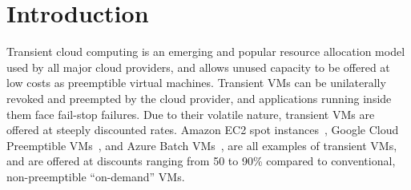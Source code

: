 \section{Introduction}
\label{sec:intro}








Transient cloud computing is an emerging and popular resource allocation model used by all major cloud providers, and allows unused capacity to be offered at low costs as preemptible virtual machines.
Transient VMs can be unilaterally revoked and preempted by the cloud provider, and applications running inside them face fail-stop failures. 
Due to their volatile nature, transient VMs are offered at steeply discounted rates. Amazon EC2 spot instances~\cite{spot-documentation}, Google Cloud Preemptible VMs~\cite{preemptible-documentation}, and Azure Batch VMs~\cite{azure-batch}, are all examples of transient VMs, and are offered at discounts ranging from 50 to 90\% compared to conventional, non-preemptible ``on-demand'' VMs.


%



